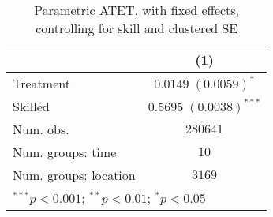 
\begin{table}
\caption{Parametric ATET, with fixed effects, controlling for skill and clustered SE}
\begin{center}
\begin{tabular}{l c}
\hline
 & (1) \\
\hline
Treatment             & $0.0149 \; (0.0059)^{*}$   \\
Skilled               & $0.5695 \; (0.0038)^{***}$ \\
\hline
Num. obs.             & $280641$                   \\
Num. groups: time     & $10$                       \\
Num. groups: location & $3169$                     \\
\hline
\multicolumn{2}{l}{\scriptsize{$^{***}p<0.001$; $^{**}p<0.01$; $^{*}p<0.05$}}
\end{tabular}
\label{table:coefficients}
\end{center}
\end{table}
